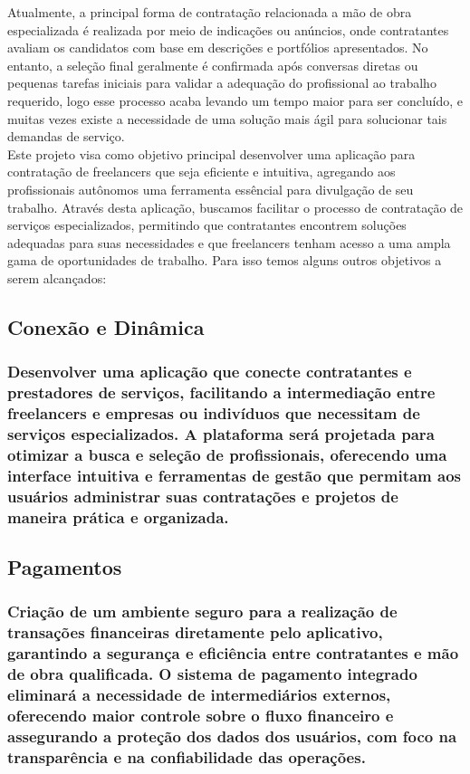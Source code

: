 Atualmente, a principal forma de contratação relacionada a mão de obra especializada é realizada por meio de indicações ou anúncios, onde contratantes avaliam os candidatos com base em descrições e portfólios apresentados. No entanto, a seleção final geralmente é confirmada após conversas diretas ou pequenas tarefas iniciais para validar a adequação do profissional ao trabalho requerido, logo esse processo acaba levando um tempo maior para ser concluído, e muitas vezes existe a necessidade de uma solução mais ágil para solucionar tais demandas de serviço.\\

Este projeto visa como objetivo principal desenvolver uma aplicação para contratação de freelancers que seja eficiente e intuitiva, agregando aos profissionais autônomos uma ferramenta essêncial para divulgação de seu trabalho. Através desta aplicação, buscamos facilitar o processo de contratação de serviços especializados, permitindo que contratantes encontrem soluções adequadas para suas necessidades e que freelancers tenham acesso a uma ampla gama de oportunidades de trabalho. Para isso temos alguns outros objetivos a serem alcançados:


\subsection{Conexão e Dinâmica}
\subsubsection{Desenvolver uma aplicação que conecte contratantes e prestadores de serviços, facilitando a intermediação entre freelancers e empresas ou indivíduos que necessitam de serviços especializados. A plataforma será projetada para otimizar a busca e seleção de profissionais, oferecendo uma interface intuitiva e ferramentas de gestão que permitam aos usuários administrar suas contratações e projetos de maneira prática e organizada.}

\subsection{Pagamentos} 
\subsubsection{Criação de um ambiente seguro para a realização de transações financeiras diretamente pelo aplicativo, garantindo a segurança e eficiência entre contratantes e mão de obra qualificada. O sistema de pagamento integrado eliminará a necessidade de intermediários externos, oferecendo maior controle sobre o fluxo financeiro e assegurando a proteção dos dados dos usuários, com foco na transparência e na confiabilidade das operações.}

